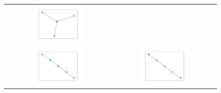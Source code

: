 \documentclass[12pt, a4paper]{extarticle}
\begin{document}
\begin{figure}
\begin{tabularx}{\textwidth}{cc}
\includegraphics[width=0.5\textwidth]{task11-graphlets/4_21-18-23-24.pdf} \\
\includegraphics[width=0.5\textwidth]{task11-graphlets/5_16-17-18-23-24.pdf} &
\includegraphics[width=0.5\textwidth]{task11-graphlets/5_16-21-17-20-23.pdf} \\
\end{tabularx}\end{figure}
\end{document}
